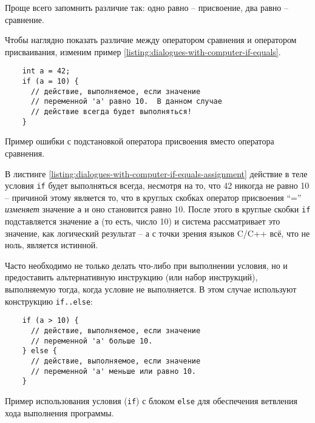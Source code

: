 \documentclass[../sparc.tex]{subfiles}
\begin{document}

Проще всего запомнить различие так: одно равно -- присвоение, два равно --
сравнение.

Чтобы наглядно показать различие между оператором сравнения и оператором
присваивания, изменим пример \ref{listing:dialogues-with-computer-if-equals}.

\begin{listing}[ht]
  \begin{verbatim}
    int a = 42;
    if (a = 10) {
      // действие, выполняемое, если значение
      // переменной 'a' равно 10.  В данном случае
      // действие всегда будет выполняться!
    }
  \end{verbatim}
  \label{listing:dialogues-with-computer-if-equals-assignment}
  \caption{Пример ошибки с подстановкой оператора присвоения вместо оператора
    сравнения.}
\end{listing}

В листинге \ref{listing:dialogues-with-computer-if-equals-assignment} действие в
теле условия \texttt{if} будет выполняться всегда, несмотря на то, что 42
никогда не равно 10 -- причиной этому является то, что в круглых скобках оператор
присвоения ``='' \emph{изменяет} значение \texttt{a} и оно становится равно 10.
После этого в круглые скобки \texttt{if} подставляется значение \texttt{a} (то
есть, число 10) и система рассматривает это значение, как логический результат --
а с точки зрения языков C/C++ всё, что не ноль, является истинной.

Часто необходимо не только делать что-либо при выполнении условия, но и
предоставить альтернативную инструкцию (или набор инструкций), выполняемую
тогда, когда условие не выполняется.  В этом случае используют конструкцию
\texttt{if..else}:

\begin{listing}[ht]
  \begin{verbatim}
    if (a > 10) {
      // действие, выполняемое, если значение
      // переменной 'a' больше 10.
    } else {
      // действие, выполняемое, если значение
      // переменной 'a' меньше или равно 10.
    }
  \end{verbatim}
  \label{listing:dialogues-with-computer-if-with-else}
  \caption{Пример использования условия (\texttt{if}) с блоком \texttt{else} для
    обеспечения ветвления хода выполнения программы.}
\end{listing}
\end{document}
